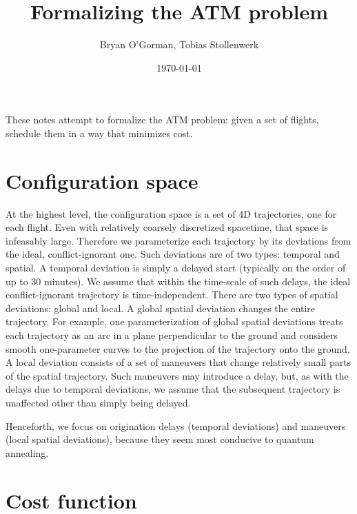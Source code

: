 \documentclass{article}
\title{Formalizing the ATM problem}
\author{Bryan O'Gorman, Tobias Stollenwerk}
\date{\today}
\begin{document}
\maketitle

These notes attempt to formalize the ATM problem: given a set of flights, schedule them in a way that minimizes cost.

\section{Configuration space}

At the highest level, the configuration space is a set of 4D trajectories, one for each flight.
Even with relatively coarsely discretized spacetime, that space is infeasably large.
Therefore we parameterize each trajectory by its deviations from the ideal, conflict-ignorant one.
Such deviations are of two types: temporal and spatial. 
A temporal deviation is simply a delayed start (typically on the order of up to 30 minutes). 
We assume that within the time-scale of such delays, the ideal conflict-ignorant trajectory is time-independent.
There are two types of spatial deviations: global and local.
A global spatial deviation changes the entire trajectory.
For example, one parameterization of global spatial deviations treats each trajectory as an arc in a plane perpendicular to the ground and considers smooth one-parameter curves to the projection of the trajectory onto the ground.
A local deviation consists of a set of maneuvers that change relatively small parts of the spatial trajectory.
Such maneuvers may introduce a delay, but, as with the delays due to temporal deviations, we assume that the subsequent trajectory is unaffected other than simply being delayed.

Henceforth, we focus on origination delays (temporal deviations) and maneuvers (local spatial deviations), because they seem most conducive to quantum annealing.

\section{Cost function}
\end{document}
